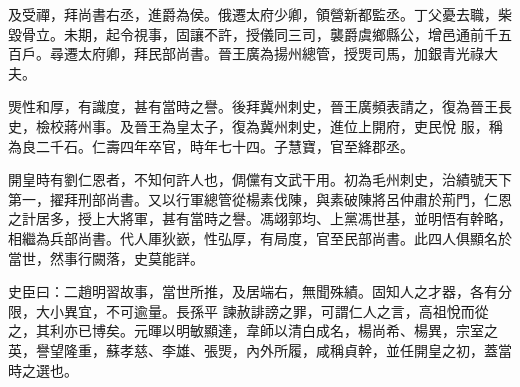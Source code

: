 \begin{pinyinscope}
 及受禪，拜尚書右丞，進爵為侯。俄遷太府少卿，領營新都監丞。丁父憂去職，柴毀骨立。未期，起令視事，固讓不許，授儀同三司，襲爵虞鄉縣公，增邑通前千五百戶。尋遷太府卿，拜民部尚書。晉王廣為揚州總管，授煚司馬，加銀青光祿大夫。



 煚性和厚，有識度，甚有當時之譽。後拜冀州刺史，晉王廣頻表請之，復為晉王長史，檢校蔣州事。及晉王為皇太子，復為冀州刺史，進位上開府，吏民悅
 服，稱為良二千石。仁壽四年卒官，時年七十四。子慧寶，官至絳郡丞。



 開皇時有劉仁恩者，不知何許人也，倜儻有文武干用。初為毛州刺史，治績號天下第一，擢拜刑部尚書。又以行軍總管從楊素伐陳，與素破陳將呂仲肅於荊門，仁恩之計居多，授上大將軍，甚有當時之譽。馮翊郭均、上黨馮世基，並明悟有幹略，相繼為兵部尚書。代人厙狄嶔，性弘厚，有局度，官至民部尚書。此四人俱顯名於當世，然事行闕落，史莫能詳。



 史臣曰：二趙明習故事，當世所推，及居端右，無聞殊績。固知人之才器，各有分限，大小異宜，不可逾量。長孫平
 諫赦誹謗之罪，可謂仁人之言，高祖悅而從之，其利亦已博矣。元暉以明敏顯達，韋師以清白成名，楊尚希、楊異，宗室之英，譽望隆重，蘇孝慈、李雄、張煚，內外所履，咸稱貞幹，並任開皇之初，蓋當時之選也。



\end{pinyinscope}